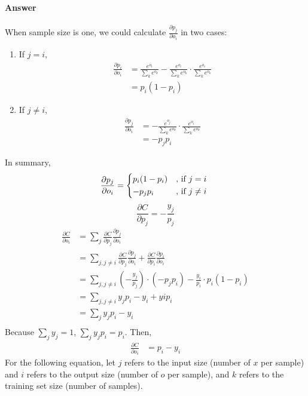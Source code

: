 \documentclass[11pt,twoside]{article}
\begin{document}
\paragraph{Answer}
When sample size is one, we could calculate $\frac{\partial p_j}{\partial o_i}$ in two cases:
\begin{enumerate}
\item If $j = i$,
\begin{align*}
\frac{\partial p_i}{\partial o_i} &= \frac{e^{o_i}}{\sum_{k}e^{o_k}} - \frac{e^{o_i}}{\sum_{k}e^{o_k}} \cdot \frac{e^{o_i}}{\sum_{k}e^{o_k}}\\
&= p_i(1 - p_i)
\end{align*}
\item If $j \neq i$,
\begin{align*}
\frac{\partial p_j}{\partial o_i} &= -\frac{e^{o_j}}{\sum_{k}e^{o_k}} \cdot \frac{e^{o_i}}{\sum_{k}e^{o_k}}\\
&= -p_jp_i
\end{align*}
\end{enumerate}
In summary,
\begin{equation}
    \frac{\partial p_j}{\partial o_i} =
    \begin{cases*}
      p_i(1 - p_i) &, if $j = i$ \\
      -p_jp_i &, if $j \neq i$
    \end{cases*}
\end{equation}
\[\frac{\partial C}{\partial p_j} = -\frac{y_j}{p_j}\]
\begin{align*}
\frac{\partial C}{\partial o_{i}} &= \sum_{j}\frac{\partial C}{\partial p_j} \frac{\partial p_j}{\partial o_i}\\
&= \sum_{j, j \neq i}\frac{\partial C}{\partial p_j} \frac{\partial p_j}{\partial o_i} + \frac{\partial C}{\partial p_i} \frac{\partial p_i}{\partial o_i}\\
&= \sum_{j, j \neq i}(-\frac{y_j}{p_j}) \cdot (-p_jp_i) - \frac{y_i}{p_i} \cdot p_i(1 - p_i)\\
&= \sum_{j, j \neq i}y_jp_i - y_i + yip_i\\
&= \sum_{j}y_jp_i - y_i\\
\end{align*}
Because $\sum_{j}y_j = 1$, $\sum_{j}y_jp_i = p_i$. Then,
\begin{align*}
\frac{\partial C}{\partial o_{i}} &= p_i - y_i
\end{align*}
For the following equation, let $j$ refers to the input size (number of $x$ per sample) and $i$ refers to the output size (number of $o$ per sample), and $k$ refers to the training set size (number of samples).\\
\end{document}
